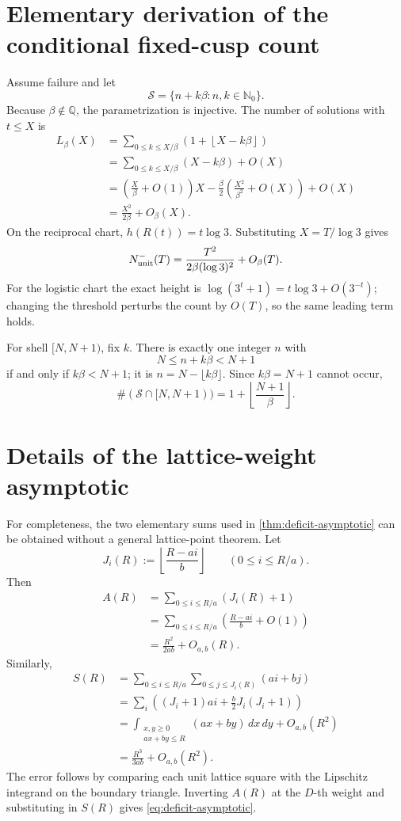 \documentclass[10pt,oneside]{article}
\theoremstyle{definition}
\theoremstyle{remark}
\newcommand{\Nzero}{\mathbb N_0}
\newcommand{\Q}{\mathbb Q}
\newcommand{\Sol}{\mathcal S}
\begin{document}
\section{Elementary derivation of the conditional fixed-cusp count}
\label{app:lattice-count}
Assume failure and let
\[
 \Sol=\{n+k\beta:n,k\in\Nzero\}.
\]
Because \(\beta\notin\Q\), the parametrization is injective.  The number of solutions with \(t\le X\) is
\begin{align*}
 L_\beta(X)
 &=\sum_{0\le k\le X/\beta}
    \left(1+\left\lfloor X-k\beta\right\rfloor\right)\\
 &=\sum_{0\le k\le X/\beta}(X-k\beta)+O(X)\\
 &=\left(\frac X\beta+O(1)\right)X
   -\frac\beta2\left(\frac{X^2}{\beta^2}+O(X)\right)+O(X)\\
 &=\frac{X^2}{2\beta}+O_\beta(X).
\end{align*}
On the reciprocal chart, \(h(R(t))=t\log3\).  Substituting \(X=T/\log3\) gives
\[
 N^-_{\rm unit}(T)
 =\frac{T^2}{2\beta(\log3)^2}+O_\beta(T).
\]
For the logistic chart the exact height is \(\log(3^t+1)=t\log3+O(3^{-t})\); changing the threshold perturbs the count by \(O(T)\), so the same leading term holds.

For shell \([N,N+1)\), fix \(k\).  There is exactly one integer \(n\) with
\[
 N\le n+k\beta<N+1
\]
if and only if \(k\beta<N+1\); it is \(n=N-\lfloor k\beta\rfloor\).  Since \(k\beta=N+1\) cannot occur,
\[
 \#(\Sol\cap[N,N+1))
 =1+\left\lfloor\frac{N+1}{\beta}\right\rfloor.
\]

\section{Details of the lattice-weight asymptotic}
\label{app:deficit-details}
For completeness, the two elementary sums used in \cref{thm:deficit-asymptotic} can be obtained without a general lattice-point theorem.  Let
\[
 J_i(R):=\left\lfloor\frac{R-ai}{b}\right\rfloor
 \qquad(0\le i\le R/a).
\]
Then
\begin{align*}
 A(R)
 &=\sum_{0\le i\le R/a}(J_i(R)+1)\\
 &=\sum_{0\le i\le R/a}
   \left(\frac{R-ai}{b}+O(1)\right)\\
 &=\frac{R^2}{2ab}+O_{a,b}(R).
\end{align*}
Similarly,
\begin{align*}
 S(R)
 &=\sum_{0\le i\le R/a}
   \sum_{0\le j\le J_i(R)}(ai+bj)\\
 &=\sum_i\left((J_i+1)ai+\frac b2J_i(J_i+1)\right)\\
 &=\int_{\substack{x,y\ge0\\ax+by\le R}}(ax+by)\,dx\,dy
   +O_{a,b}(R^2)\\
 &=\frac{R^3}{3ab}+O_{a,b}(R^2).
\end{align*}
The error follows by comparing each unit lattice square with the Lipschitz integrand on the boundary triangle.  Inverting \(A(R)\) at the \(D\)-th weight and substituting in \(S(R)\) gives \eqref{eq:deficit-asymptotic}.
\end{document}
